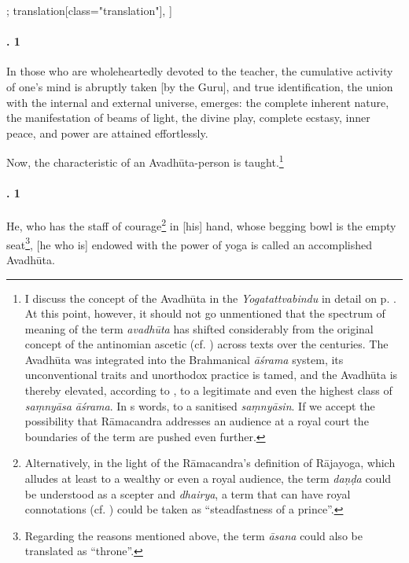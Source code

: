 \begin{alignment}[
  texts=edition[class="edition"];
  translation[class="translation"],
  ]
\begin{translation}
\begin{tlate}[43_1]
 \paragraph{. 1} In those who are wholeheartedly devoted to the teacher, the cumulative activity of one's mind is abruptly taken [by the Guru], and true identification, the union with the internal and external universe, emerges: the complete inherent nature, the manifestation of beams of light, the divine play, complete ecstasy, inner peace, and power are attained effortlessly.
\end{tlate}
\begin{tlate}[43_02]
  Now, the characteristic of an Avadhūta-person is taught.\footnote{I discuss the concept of the Avadhūta in the \textit{Yogatattvabindu} in detail on p. \pageref{avadhutapurusa}. At this point, however, it should not go unmentioned that the spectrum of meaning of the term \textit{avadhūta} has shifted considerably from the original concept of the antinomian ascetic (cf. \citeauthor[2023]{pudi2023}) across texts over the centuries. The Avadhūta was integrated into the Brahmanical \textit{āśrama} system, its unconventional traits and unorthodox practice is tamed, and the Avadhūta is thereby elevated, according to \citeauthor{pudi2023}, to a legitimate and even the highest class of \textit{saṃnyāsa āśrama}. In \citeauthor{pudi2023}s words, to a sanitised \textit{saṃnyāsin}. If we accept the possibility that Rāmacandra addresses an audience at a royal court the boundaries of the term are pushed even further.}
  \end{tlate}
  \begin{tlate}[44_1]
  \paragraph{. 1} He, who has the staff of courage\footnote{Alternatively, in the light of the Rāmacandra's definition of Rājayoga, which alludes at least to a wealthy or even a royal audience, the term \textit{daṇḍa} could be understood as a scepter and \textit{dhairya}, a term that can have royal connotations (cf. \citeauthor[1858:167]{petersburger3}) could be taken as ``steadfastness of a prince''.} in [his] hand, whose begging bowl is the empty seat\footnote{Regarding the reasons mentioned above, the term \textit{āsana} could also be translated as ``throne''.}, [he who is] endowed with the power of yoga is called an accomplished Avadhūta.
  \flushpage
    \end{tlate}
  \end{translation}
\end{alignment}
